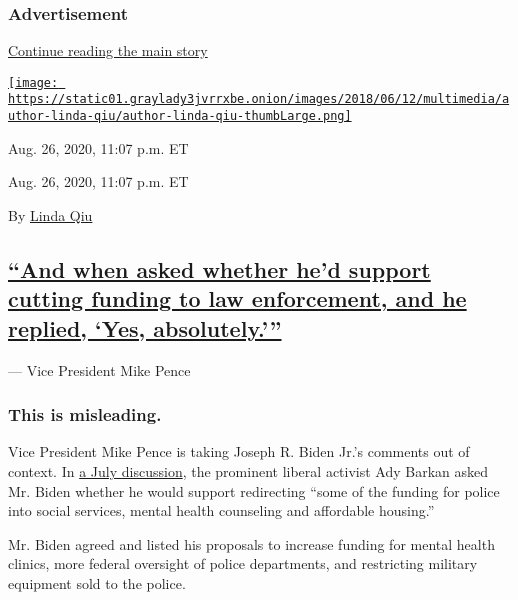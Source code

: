 \hypertarget{advertisement-2}{%
\subsubsection{Advertisement}\label{advertisement-2}}

\protect\hyperlink{after-dfp-ad-mid3}{Continue reading the main story}

\href{https://www.nytimes3xbfgragh.onion/by/linda-qiu}{\texttt{[image: https://static01.graylady3jvrrxbe.onion/images/2018/06/12/multimedia/author-linda-qiu/author-linda-qiu-thumbLarge.png]}}

Aug. 26, 2020, 11:07 p.m. ET

Aug. 26, 2020, 11:07 p.m. ET

By \href{https://www.nytimes3xbfgragh.onion/by/linda-qiu}{Linda Qiu}

\hypertarget{and-when-asked-whether-hed-support-cutting-funding-to-law-enforcement-and-he-replied-yes-absolutely}{%
\subsection{\texorpdfstring{\protect\hyperlink{and-when-asked-whether-hed-support-cutting-funding-to-law-enforcement-and-he-replied-yes-absolutely}{``And
when asked whether he'd support cutting funding to law enforcement, and
he replied, `Yes,
absolutely.'''}}{``And when asked whether he'd support cutting funding to law enforcement, and he replied, `Yes, absolutely.'''}}\label{and-when-asked-whether-hed-support-cutting-funding-to-law-enforcement-and-he-replied-yes-absolutely}}

--- Vice President Mike Pence

\hypertarget{this-is-misleading-}{%
\subsubsection{This is misleading. }\label{this-is-misleading-}}

Vice President Mike Pence is taking Joseph R. Biden Jr.'s comments out
of context. In \href{https://www.youtube.com/watch?v=EEIPXpdeia8}{a July
discussion}, the prominent liberal activist Ady Barkan asked Mr. Biden
whether he would support redirecting ``some of the funding for police
into social services, mental health counseling and affordable housing.''

Mr. Biden agreed and listed his proposals to increase funding for mental
health clinics, more federal oversight of police departments, and
restricting military equipment sold to the police.

